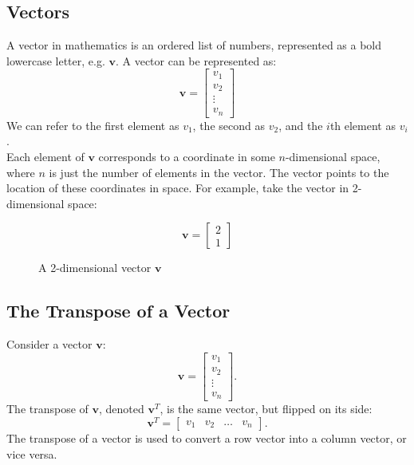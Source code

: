 \documentclass[9pt]{extarticle}
\theoremstyle{plain}
\theoremstyle{definition}
\theoremstyle{remark}
\begin{document}
\subsection*{Vectors}
A vector in mathematics is an ordered list of numbers, represented as a bold lowercase letter, e.g. $\mathbf{v}$. A vector can be represented as:
$$\mathbf{v} = \begin{bmatrix} v_1 \\ v_2 \\ \vdots \\ v_n \end{bmatrix}$$
We can refer to the first element as $v_1$, the second as $v_2$, and the $i$th element as $v_i$. \\
Each element of $\mathbf{v}$ corresponds to a coordinate in some $n$-dimensional space, where $n$ is just the number of elements in the vector. The vector points to the location of these coordinates in space. For example, take the vector in 2-dimensional space:
\begin{figure}[h]
    \begin{subfigure}[c]{0.48\textwidth}
        \centering
        $$\mathbf{v} = \begin{bmatrix} 2 \\ 1 \end{bmatrix}$$
    \end{subfigure}
    \begin{subfigure}[c]{0.48\textwidth}
        \centering
    \end{subfigure}
    \caption{A 2-dimensional vector $\mathbf{v}$}
\end{figure}

\subsection*{The Transpose of a Vector}
Consider a vector $\mathbf{v}$:
$$\mathbf{v} = \begin{bmatrix} v_1 \\ v_2 \\ \vdots \\ v_n \end{bmatrix}.$$
The transpose of $\mathbf{v}$, denoted $\mathbf{v}^T$, is the same vector, but flipped on its side:
$$\mathbf{v}^T = \begin{bmatrix} v_1 & v_2 & \ldots & v_n \end{bmatrix}.$$
The transpose of a vector is used to convert a row vector into a column vector, or vice versa.
\end{document}
